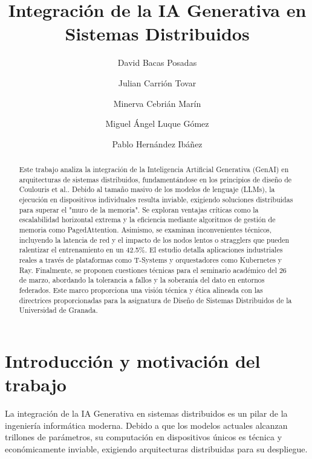 \documentclass[runningheads]{llncs}
\begin{document}
%
\title{Integración de la IA Generativa en Sistemas Distribuidos}
%
%
\author{David Bacas Posadas \and
Julian Carrión Tovar \and
Minerva Cebrián Marín \and 
Miguel Ángel Luque Gómez \and 
Pablo Hernández Ibáñez}
%
%
%
\maketitle              %
%
\begin{abstract}
Este trabajo analiza la integración de la Inteligencia Artificial Generativa (GenAI) en arquitecturas de sistemas distribuidos, fundamentándose en los principios de diseño de Coulouris et al.. Debido al tamaño masivo de los modelos de lenguaje (LLMs), la ejecución en dispositivos individuales resulta inviable, exigiendo soluciones distribuidas para superar el "muro de la memoria". Se exploran ventajas críticas como la escalabilidad horizontal extrema y la eficiencia mediante algoritmos de gestión de memoria como PagedAttention. Asimismo, se examinan inconvenientes técnicos, incluyendo la latencia de red y el impacto de los nodos lentos o stragglers que pueden ralentizar el entrenamiento en un 42.5\%. El estudio detalla aplicaciones industriales reales a través de plataformas como T-Systems y orquestadores como Kubernetes y Ray. Finalmente, se proponen cuestiones técnicas para el seminario académico del 26 de marzo, abordando la tolerancia a fallos y la soberanía del dato en entornos federados. Este marco proporciona una visión técnica y ética alineada con las directrices proporcionadas para la asignatura de Diseño de Sistemas Distribuidos de la Universidad de Granada.

\end{abstract}
%
%
%
\section{Introducción y motivación del trabajo}

La integración de la IA Generativa en sistemas distribuidos es un pilar de la ingeniería informática moderna. Debido a que los modelos actuales alcanzan trillones de parámetros, su computación en dispositivos únicos es técnica y económicamente inviable, exigiendo arquitecturas distribuidas para su despliegue.
\end{document}
